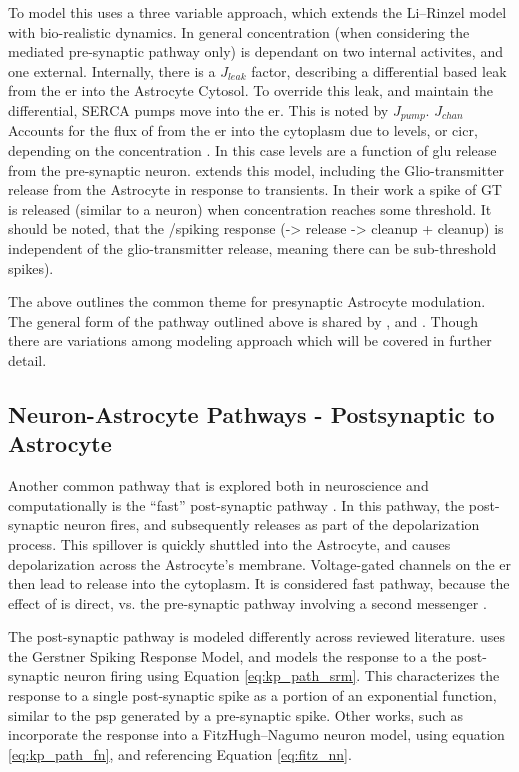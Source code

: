     To model this \parencite{pitta_2009} uses a three variable approach, which
    extends the Li–Rinzel model with bio-realistic \ipt dynamics. In general \ca
    concentration (when considering the \ipt mediated pre-synaptic pathway only)
    is dependant on two internal activites, and one external. Internally, there
    is a $J_{leak}$ factor, describing a differential based leak from the \Gls{er}
    into the Astrocyte Cytosol. To override this leak, and maintain the
    differential, SERCA pumps move \ca into the \Gls{er}. This is noted by
    $J_{pump}$. $J_{chan}$ Accounts for the flux of \ca from the \Gls{er} into the
    cytoplasm due to \ipt levels, or \Gls{cicr}, depending on the \ca concentration
    \cite{pitta_2009}. In this case \ipt levels are a function of \Gls{glu}
    release from the pre-synaptic neuron. \parencite{pitta_2016} extends this model,
    including the Glio-transmitter release from the Astrocyte in response to
    \ca transients. In their work a spike of GT is released (similar to a
    neuron) when \ca concentration reaches some threshold. It should be noted,
    that the \ipt/\ca spiking response (\ipt -> \ca release -> \ipt cleanup + \ca
    cleanup) is independent of the glio-transmitter release, meaning there can be
    sub-threshold \ca spikes).

    The above outlines the common theme for presynaptic Astrocyte
    modulation. The general form of the pathway outlined above is shared by
    \parencite{postnov_2009}, and \parencite{wade_2011}. Though there are
    variations among modeling approach which will be covered in further detail.

    \subsection{Neuron-Astrocyte Pathways - Postsynaptic to Astrocyte}
    Another common pathway that is explored both in neuroscience and
    computationally is the ``fast'' post-synaptic pathway \cite{bassam_2015}. In
    this pathway, the post-synaptic neuron fires, and subsequently releases \kp
    as part of the depolarization process. This \kp spillover is quickly shuttled
    into the Astrocyte, and causes depolarization across the Astrocyte's
    membrane. Voltage-gated channels on the \Gls{er} then lead to \ca release into
    the cytoplasm. It is considered fast pathway, because the effect of \kp is
    direct, vs. the pre-synaptic pathway involving a second messenger
    \cite{bassam_2015}.

    The post-synaptic pathway is modeled differently across reviewed
    literature. \parencite{bassam_2015} uses the Gerstner Spiking Response
    Model, and models the \ca response to a the post-synaptic neuron firing
    using Equation \ref{eq:kp_path_srm}. This characterizes the response to a
    single post-synaptic spike as a portion of an exponential function, similar
    to the \Gls{psp} generated by a pre-synaptic spike. Other works, such as
    \parencite{postnov_2007} incorporate the \ca response into a FitzHugh–Nagumo
    neuron model, using equation \ref{eq:kp_path_fn}, and referencing Equation
    \ref{eq:fitz_nn}.


